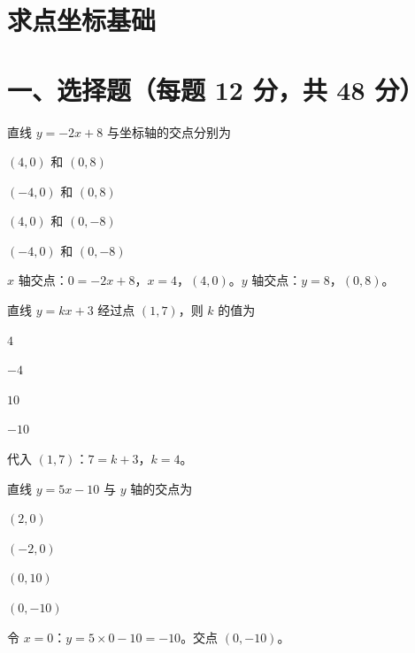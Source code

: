 \documentclass{exam-zh}
\begin{document}
\section*{求点坐标基础}

\section*{一、选择题（每题 12 分，共 48 分）}



\begin{question}[points=12]
  直线 $y = -2x + 8$ 与坐标轴的交点分别为
  \begin{choices}
    \item $(4, 0)$ 和 $(0, 8)$
    \item $(-4, 0)$ 和 $(0, 8)$
    \item $(4, 0)$ 和 $(0, -8)$
    \item $(-4, 0)$ 和 $(0, -8)$
  \end{choices}
  \paren[A]
  \begin{solutionblock}
    $x$ 轴交点：$0=-2x+8$，$x=4$，$(4,0)$。$y$ 轴交点：$y=8$，$(0,8)$。
  \end{solutionblock}
\end{question}



\begin{question}[points=12]
  直线 $y = kx + 3$ 经过点 $(1, 7)$，则 $k$ 的值为
  \begin{choices}
    \item $4$
    \item $-4$
    \item $10$
    \item $-10$
  \end{choices}
  \paren[A]
  \begin{solutionblock}
    代入 $(1, 7)$：$7=k+3$，$k=4$。
  \end{solutionblock}
\end{question}



\begin{question}[points=12]
  直线 $y = 5x - 10$ 与 $y$ 轴的交点为
  \begin{choices}
    \item $(2, 0)$
    \item $(-2, 0)$
    \item $(0, 10)$
    \item $(0, -10)$
  \end{choices}
  \paren[D]
  \begin{solutionblock}
    令 $x=0$：$y=5 \times 0 - 10 = -10$。交点 $(0, -10)$。
  \end{solutionblock}
\end{question}
\end{document}
